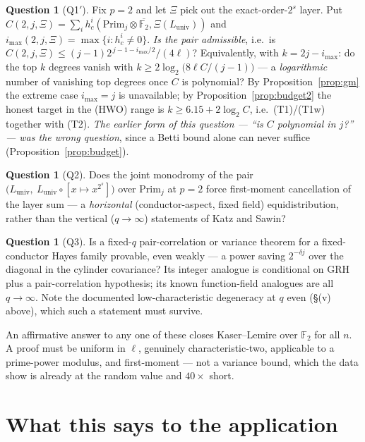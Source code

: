 \documentclass[10pt]{article}
\theoremstyle{plain}
\theoremstyle{definition}
\newtheorem{question}[theorem]{Question}
\newcommand{\F}{\mathbb F}
\newcommand{\Prim}{\mathrm{Prim}}
\newcommand{\Luniv}{L_{\mathrm{univ}}}
\newcommand{\imax}{i_{\max}}
\begin{document}
\begin{question}[Q1$'$]
Fix $p=2$ and let $\Xi$ pick out the exact-order-$2^s$ layer. Put
$C(2,j,\Xi)=\sum_ih^i_c(\Prim_j\otimes\overline{\F_2},\Xi(\Luniv))$ and
$\imax(2,j,\Xi)=\max\{i:h^i_c\ne0\}$. \emph{Is the pair admissible}, i.e.\ is
$C(2,j,\Xi)\le(j-1)2^{\,j-1-\imax/2}/(4\ell)$? Equivalently, with $k=2j-\imax$:
do the top $k$ degrees vanish with $k\ge2\log_2\bigl(8\ell C/(j-1)\bigr)$ --- a
\emph{logarithmic} number of vanishing top degrees once $C$ is polynomial? By
Proposition~\ref{prop:gm} the extreme case $\imax=j$ is unavailable; by
Proposition~\ref{prop:budget2} the honest target in the (HWO) range is
$k\ge6.15+2\log_2C$, i.e.\ (T1)/(T1w) together with (T2). \emph{The earlier
form of this question --- ``is $C$ polynomial in $j$?'' --- was the wrong
question}, since a Betti bound alone can never suffice
(Proposition~\ref{prop:budget}).
\end{question}

\begin{question}[Q2]
Does the joint monodromy of the pair
$\bigl(\Luniv,\ \Luniv\circ[x\mapsto x^{2^s}]\bigr)$ over $\Prim_j$ at $p=2$
force first-moment cancellation of the layer sum --- a \emph{horizontal}
(conductor-aspect, fixed field) equidistribution, rather than the vertical
($q\to\infty$) statements of Katz and Sawin?
\end{question}

\begin{question}[Q3]
Is a fixed-$q$ pair-correlation or variance theorem for a fixed-conductor Hayes
family provable, even weakly --- a power saving $2^{-\delta j}$ over the diagonal
in the cylinder covariance? Its integer analogue is conditional on GRH plus a
pair-correlation hypothesis; its known function-field analogues are all
$q\to\infty$. Note the documented low-characteristic degeneracy at $q$ even
(\S(v) above), which such a statement must survive.
\end{question}

An affirmative answer to any one of these closes Kaser--Lemire over $\F_2$ for
all $n$. A proof must be uniform in $\ell$, genuinely characteristic-two,
applicable to a prime-power modulus, and first-moment --- not a variance bound,
which the data show is already at the random value and $40\times$ short.

\section{What this says to the application}\label{sec:applied}
\end{document}
